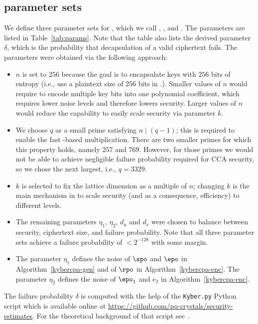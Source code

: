 \subsection{\Kyber parameter sets}
\label{subsec:specification:params}

We define three parameter sets for \Kyber, which we call \KyberLow, \KyberMid, and \KyberHigh.
The parameters are listed in Table~\ref{tab:params}. Note that the table also lists the
derived parameter $\delta$, which is the probability that decapsulation of a valid
\KyberCCAKEM ciphertext fails. The parameters were obtained via the following approach:
\begin{itemize}
  \item $n$ is set to $256$ because the goal is to encapsulate keys with $256$ bits of entropy 
    (i.e., use a plaintext size of $256$ bits in \KyberCPAPKE.\PKEEnc).
    Smaller values of $n$ would require to encode multiple key bits into one polynomial
    coefficient, which requires lower noise levels and therefore lowers security.
    Larger values of $n$ would reduce the capability to easily scale security via
    parameter $k$.
  \item We choose $q$ as a small prime satisfying $n \mid (q-1)$; 
    this is required to enable the fast \NTT-based multiplication.
    There are two smaller primes for which this property holds, namely
    $257$ and $769$. However, for those primes we would not be able
    to achieve negligible failure probability required for CCA security, 
    so we chose the next largest, i.e., $q=3329$.
  \item $k$ is selected to fix the lattice dimension as a multiple of $n$;
    changing $k$ is the main mechanism in \Kyber to scale security (and as a consequence,
    efficiency) to different levels.
  \item The remaining parameters $\eta_1$, $\eta_2$, $d_u$ and $d_v$ were chosen to balance
    between security, ciphertext size,
    and failure probability. Note that all three parameter sets achieve a failure probability of $<2^{-128}$
    with some margin.
  \item The parameter $\eta_1$ defines the noise of $\spo$ and $\epo$ in Algorithm~\ref{kybercpa-gen} and of $\rpo$ in Algorithm~\ref{kybercpa-enc}.  The parameter $\eta_2$ defines the noise of $\epo_1$ and $e_2$ in Algorithm~\ref{kybercpa-enc}. 
\end{itemize}

The failure probability $\delta$ is computed with the help of the \verb_Kyber.py_ 
Python script which is available online at 
\url{https://github.com/pq-crystals/security-estimates}.
For the theoretical background of that script see~\cite[Theorem~1]{BDK+18}.

